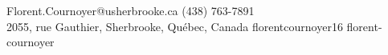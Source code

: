\documentclass[11pt]{article}
\begin{document}
{Florent.Cournoyer@usherbrooke.ca}
{(438) 763-7891 \\}
{2055, rue Gauthier, Sherbrooke, Québec, Canada}
{florentcournoyer16}
{florent-cournoyer}















% 

% 
\end{document}
